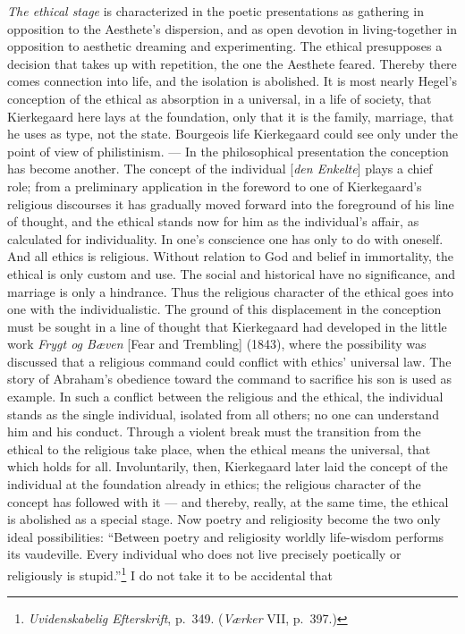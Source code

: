 \documentclass[12pt,a4paper]{book}
\newcommand{\opage}[1]{\marginnote{\footnotesize\textit{[#1]}}}
\begin{document}
\emph{The ethical stage} is characterized in the poetic presentations as gathering in
opposition to the Aesthete's dispersion, and as open devotion in living-together in opposition
to aesthetic dreaming and experimenting. The ethical presupposes a decision that takes up with
repetition, the one the Aesthete feared. Thereby there comes connection into life, and the
isolation is abolished. It is most nearly Hegel's conception of the \opage{159}ethical as absorption in a
universal, in a life of society, that Kierkegaard here lays at the foundation, only that it is
the family, marriage, that he uses as type, not the state. Bourgeois life Kierkegaard could
see only under the point of view of philistinism. --- In the philosophical presentation the
conception has become another. The concept of the individual [\emph{den Enkelte}] plays a
chief role; from a preliminary application in the foreword to one of Kierkegaard's religious
discourses it has gradually moved forward into the foreground of his line of thought, and the
ethical stands now for him as the individual's affair, as calculated for individuality. In
one's conscience one has only to do with oneself. And all ethics is religious. Without relation
to God and belief in immortality, the ethical is only custom and use. The social and historical
have no significance, and marriage is only a hindrance. Thus the religious character of the
ethical goes into one with the individualistic. The ground of this displacement in the
conception must be sought in a line of thought that Kierkegaard had developed in the little
work \emph{Frygt og Bæven} [Fear and Trembling] (1843), where the possibility was discussed
that a religious command could conflict with ethics' universal law. The story of Abraham's
obedience toward the command to sacrifice his son is used as example. In such a conflict
between the religious and the ethical, the individual stands as the single individual, isolated
from all others; no one can understand him and his conduct. Through a violent break must the
transition from the ethical to the religious take place, when the ethical means the universal,
that which holds for all. Involuntarily, then, Kierkegaard later laid the concept of the
individual at the foundation already in ethics; the religious character of the concept has
followed with it --- and thereby, really, at the same time, the ethical is abolished as a
special stage. Now poetry and religiosity become the two only ideal possibilities: ``Between
poetry and religiosity worldly life-wisdom performs its vaudeville. Every individual who does
not live precisely poetically or religiously is stupid.''\footnote{\emph{Uvidenskabelig
Efterskrift}, p.~349. (\emph{Værker} VII, p.~397.)} I do not take it to be accidental that
\end{document}
